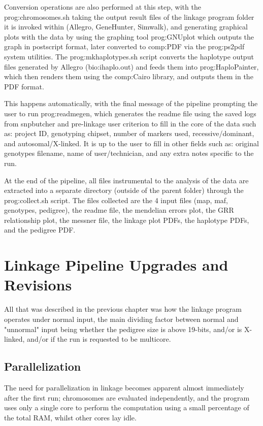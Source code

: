 Conversion operations are also performed at this step, with the \gls{prog:chromosomes.sh} taking the output result files of the linkage program folder it is invoked within (Allegro, GeneHunter, Simwalk), and generating graphical plots with the data by using the graphing tool \gls{prog:GNUplot} which outputs the graph in postscript format, later converted to \gls{comp:PDF} via the \gls{prog:ps2pdf} system utilities. The \gls{prog:mkhaplotypes.sh} script converts the haplotype output files generated by Allegro (\gls{bio:ihaplo.out}) and feeds them into \gls{prog:HaploPainter}, which then renders them using the \gls{comp:Cairo} library, and outputs them in the PDF format.

This happens automatically, with the final message of the pipeline prompting the user to run \gls{prog:readmegen}, which generates the readme file using the saved logs from snpbutcher and pre-linkage user criterion to fill in the core of the data such as: project ID, genotyping chipset, number of markers used, recessive/dominant, and autosomal/X-linked. It is up to the user to fill in other fields such as: original genotypes filename, name of user/technician, and any extra notes specific to the run.

At the end of the pipeline, all files instrumental to the analysis of the data are extracted into a separate directory (outside of the parent folder) through the \gls{prog:collect.sh} script. The files collected are the 4 input files (map, maf, genotypes, pedigree), the readme file, the mendelian errors plot, the GRR relationship plot, the messner file, the linkage plot PDFs, the haplotype PDFs, and the pedigree PDF.


\section{Linkage Pipeline Upgrades and Revisions}

All that was described in the previous chapter was how the linkage program operates under normal input, the main dividing factor between normal and "unnormal" input being whether the pedigree size is above 19-bits, and/or is X-linked, and/or if the run is requested to be multicore.

\subsection{Parallelization}

The need for parallelization in linkage becomes apparent almost immediately after the first run; chromosomes are evaluated independently, and the program uses only a single core to perform the computation using a small percentage of the total RAM, whilst other cores lay idle.

